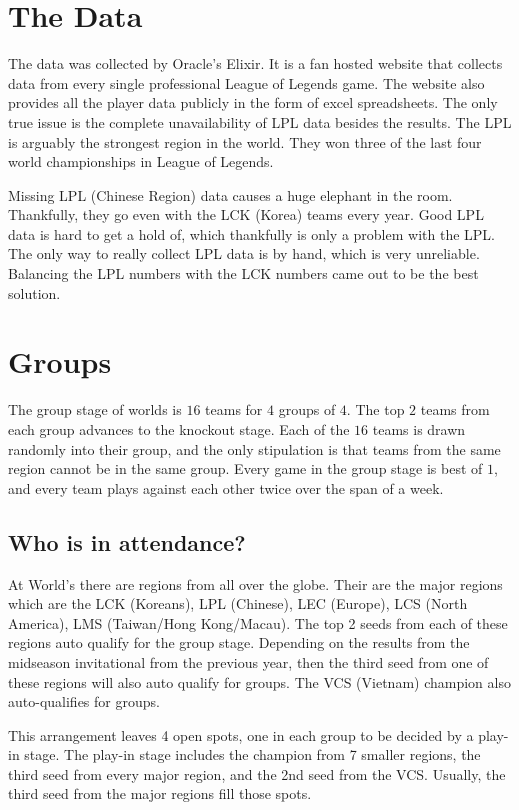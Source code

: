\documentclass[11pt]{article}
\theoremstyle{plain}
\theoremstyle{definition}
\numberwithin{equation}{section}
\numberwithin{theorem}{section}
\numberwithin{lemma}{section}
\numberwithin{definition}{section}
\numberwithin{proposition}{section}
\numberwithin{corollary}{section}
\begin{document}
\section{The Data}
	The data was collected by Oracle's Elixir. It is a fan hosted website that collects data from every single professional League of Legends game. The website also provides all the player data publicly in the form of excel spreadsheets. The only true issue is the complete unavailability of LPL data besides the results. The LPL is arguably the strongest region in the world. They won three of the last four world championships in League of Legends.


	Missing LPL (Chinese Region) data causes a huge elephant in the room. Thankfully, they go even with the LCK (Korea) teams every year. Good LPL data is hard to get a hold of, which thankfully is only a problem with the LPL. The only way to really collect LPL data is by hand, which is very unreliable. Balancing the LPL numbers with the LCK numbers came out to be the best solution.

\section{Groups}
	The group stage of worlds is $16$ teams for $4$ groups of $4$. The top $2$ teams from each group advances to the knockout stage. Each of the $16$ teams is drawn randomly into their group, and the only stipulation is that teams from the same region cannot be in the same group. Every game in the group stage is best of $1$, and every team plays against each other twice over the span of a week.

\subsection{Who is in attendance?}
	At World's there are regions from all over the globe. Their are the major regions which are the LCK (Koreans), LPL (Chinese), LEC (Europe), LCS (North America), LMS (Taiwan/Hong Kong/Macau). The top 2 seeds from each of these regions auto qualify for the group stage. Depending on the results from the midseason invitational from the previous year, then the third seed from one of these regions will also auto qualify for groups. The VCS (Vietnam) champion also auto-qualifies for groups. 
	
	
	This arrangement leaves 4 open spots, one in each group to be decided by a play-in stage. The play-in stage includes the champion from 7 smaller regions, the third seed from every major region, and the 2nd seed from the VCS. Usually, the third seed from the major regions fill those spots.
	
\end{document}
